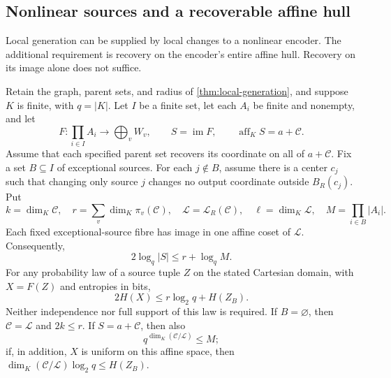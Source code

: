 \subsection{Nonlinear sources and a recoverable affine hull}
\label{sec:local-sources}

Local generation can be supplied by local changes to a nonlinear encoder.
The additional requirement is recovery on the encoder's entire affine hull.
Recovery on its image alone does not suffice.

\begin{theorem}\label{thm:local-sources}
\notformalized
Retain the graph, parent sets, and radius of
\cref{thm:local-generation}, and suppose $K$ is finite, with $q=|K|$.
Let $I$ be a finite set, let each $A_i$ be finite and nonempty, and let
\[
 F:\prod_{i\in I}A_i\longrightarrow\bigoplus_v W_v,
 \qquad S=\operatorname{im}F,\qquad
 \operatorname{aff}_K S=a+\mathcal C.
\]
Assume that each specified parent set recovers its coordinate on all of
$a+\mathcal C$. Fix a set $B\subseteq I$ of exceptional sources.
For each $j\notin B$, assume there is a center $c_j$ such that changing
only source $j$ changes no output coordinate outside $B_R(c_j)$.
Put
\[
 k=\dim_K\mathcal C,\quad
 r=\sum_v\dim_K\pi_v(\mathcal C),\quad
 \mathcal L=\mathcal L_R(\mathcal C),\quad
 \ell=\dim_K\mathcal L,\quad M=\prod_{i\in B}|A_i|.
\]
Each fixed exceptional-source fibre has image in one affine coset of
$\mathcal L$. Consequently,
\begin{equation}\label{eq:local-source-size}
 2\log_q|S|\le r+\log_q M.
\end{equation}
For any probability law of a source tuple $Z$ on the stated Cartesian
domain, with $X=F(Z)$ and entropies in bits,
\begin{equation}\label{eq:local-source-entropy}
 2H(X)\le r\log_2q+H(Z_B).
\end{equation}
Neither independence nor full support of this law is required.
If $B=\varnothing$, then $\mathcal C=\mathcal L$ and $2k\le r$.
If $S=a+\mathcal C$, then also
\[
 q^{\dim_K(\mathcal C/\mathcal L)}\le M;
\]
if, in addition, $X$ is uniform on this affine space, then
$\dim_K(\mathcal C/\mathcal L)\log_2q\le H(Z_B)$.
\end{theorem}

